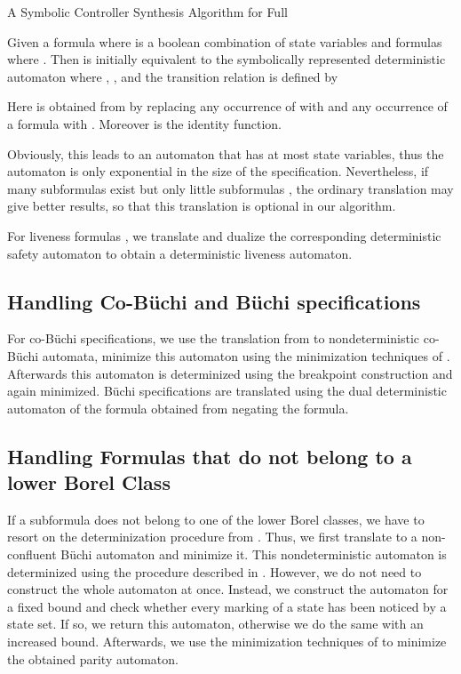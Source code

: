 \documentclass[copyright,creativecommons]{eptcs}
\begin{document}
\begin{section}{A Symbolic Controller Synthesis Algorithm for Full }
\begin{proposition}
Given a formula  where  is a boolean combination of state variables  and formulas  where . Then  is initially equivalent to the symbolically represented deterministic automaton  where , ,  and the transition relation is defined by

Here  is obtained from  by replacing any occurrence of  with  and any occurrence of a formula  with . Moreover  is the identity function. \end{proposition}

Obviously, this leads to an automaton that has at most  state variables, thus the automaton is only exponential in the size of the specification. Nevertheless, if many subformulas  exist but only little subformulas , the ordinary translation may give better results, so that this translation is optional in our algorithm.

For liveness formulas , we translate  and dualize the corresponding deterministic safety automaton to obtain a deterministic liveness automaton.


\subsection{Handling Co-Büchi and Büchi specifications}

For co-Büchi specifications, we use the translation from  to nondeterministic co-Büchi automata, minimize this automaton using the minimization techniques of \cite{Frit05b}. Afterwards this automaton is determinized using the breakpoint construction and again minimized. Büchi specifications are translated using the dual deterministic automaton of the formula obtained from negating the formula.


\subsection{Handling  Formulas that do not belong to a lower Borel Class}

If a subformula  does not belong to one of the lower Borel classes, we have to resort on the determinization procedure from \cite{MoSc08}. Thus, we first translate  to a non-confluent Büchi automaton and minimize it. This nondeterministic automaton is determinized using the procedure described in \cite{MoSc08}. However, we do not need to construct the whole automaton at once. Instead, we construct the automaton for a fixed bound  and check whether every marking of a state has been noticed by a state set. If so, we return this automaton, otherwise we do the same with an increased bound. Afterwards, we use the minimization techniques of \cite{Frit05b} to minimize the obtained parity automaton.


\end{section}
\end{document}

